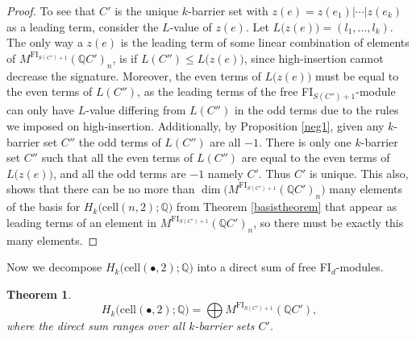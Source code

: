 \documentclass[12py]{amsart}%
\newtheorem{thm}{Theorem}[section]
\theoremstyle{definition}\newtheorem{definition}[thm]{Definition}
\theoremstyle{definition}
\newcommand{\Q}{\ensuremath{\mathbb{Q}}}
\begin{document}
\begin{proof}
To see that $C'$ is the unique $k$-barrier set with $z(e)=z(e_{1})|\cdots|z(e_{k})$ as a leading term, consider the $L$-value of $z(e)$. Let $L\big(z(e)\big)=(l_{1},\dots, l_{k})$. The only way a $z(e)$ is the leading term of some linear combination of elements of $M^{\text{FI}_{S(C')+1}}(\Q C')_{n}$, is if $L(C'')\le L\big(z(e)\big)$, since high-insertion cannot decrease the signature. Moreover, the even terms of $L\big(z(e)\big)$ must be equal to the even terms of $L(C'')$, as the leading terms of the free FI$_{S(C'')+1}$-module can only have $L$-value differing from $L(C'')$ in the odd terms due to the rules we imposed on high-insertion. Additionally, by Proposition \ref{neg1}, given any $k$-barrier set $C''$ the odd terms of $L(C'')$ are all $-1$. There is only one $k$-barrier set $C''$ such that all the even terms of $L(C'')$ are equal to the even terms of $L\big(z(e)\big)$, and all the odd terms are $-1$ namely $C'$. Thus $C'$ is unique. This also, shows that there can be no more than $\dim\big(M^{\text{FI}_{S(C')+1}}(\Q C')_{n}\big)$ many elements of the basis for $H_{k}\big(\text{cell}(n,2);\Q\big)$ from Theorem \ref{basistheorem} that appear as leading terms of an element in $M^{\text{FI}_{S(C')+1}}(\Q C')_{n}$, so there must be exactly this many elements.
\end{proof}

Now we decompose $H_{k}\big(\text{cell}(\bullet,2);\Q\big)$ into a direct sum of free FI$_{d}$-modules.

\begin{thm}\label{wegeteverything}
\[
H_{k}\big(\text{cell}(\bullet,2);\Q\big)=\bigoplus M^{\text{FI}_{S(C')+1}}(\Q C'),
\]
where the direct sum ranges over all $k$-barrier sets $C'$.
\end{thm}
\end{document}
